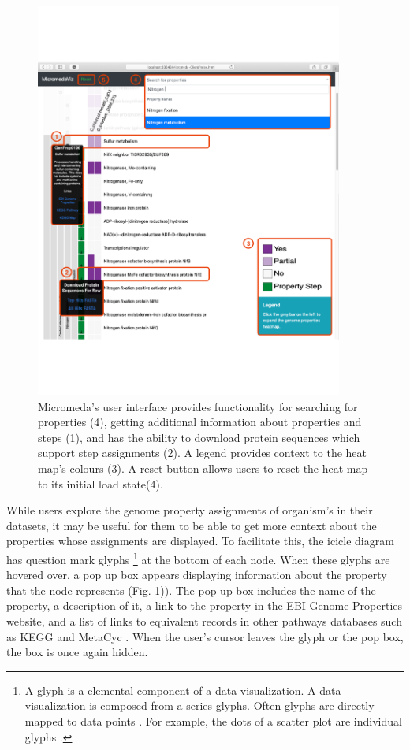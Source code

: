 \begin{figure}[!ht]
  \centering
	\includegraphics[width=0.9\textwidth]{media/micromeda-interface.pdf}
	 \caption{Micromeda's user interface provides functionality for searching for properties (4), getting additional information about properties and steps (1), and has the ability to download protein sequences which support step assignments (2). A legend provides context to the heat map's colours (3). A reset button allows users to reset the heat map to its initial load state(4).}
	 \label{fig:micromeda-interface}
\end{figure}

While users explore the genome property assignments of organism's in their datasets, it may be useful for them to be able to get more context about the properties whose assignments are displayed. To facilitate this, the icicle diagram has question mark glyphs \footnote{A glyph is a elemental component of a data visualization. A data visualization is composed from a series glyphs. Often glyphs are directly mapped to data points \cite{chen}. For example, the dots of a scatter plot are individual glyphs \cite{chen}.} at the bottom of each node. When these glyphs are hovered over, a pop up box appears displaying information about the property that the node represents (Fig. \ref{fig:micromeda-interface})). The pop up box includes the name of the property, a description of it, a link to the property in the EBI Genome Properties website, and a list of links to equivalent records in other pathways databases such as KEGG \cite{kanehisa2000kegg} and MetaCyc \cite{karp2002metacyc}. When the user's cursor leaves the glyph or the pop box, the box is once again hidden.

